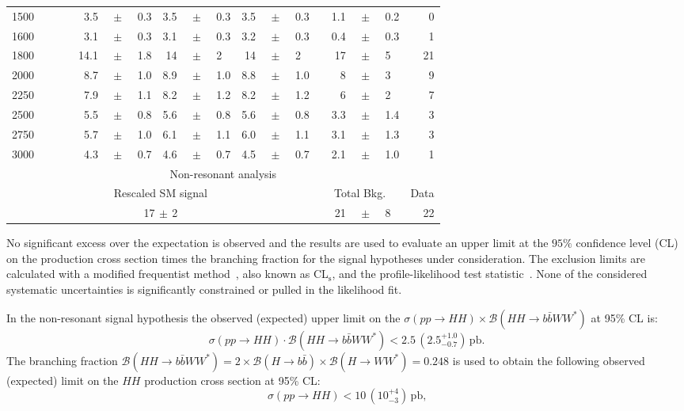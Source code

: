 \begin{table}
\begin{center}
\begin{tabular}{r|*{4}{r@{}c@{}l|}r}
1500~~~~~~& 3.5&$\,\pm\,$&0.3 & 3.5&$\,\pm\,$&0.3 & 3.5&$\,\pm\,$&0.3 & 1.1&$\,\pm\,$&0.2 & 0 \\
1600~~~~~~& 3.1&$\,\pm\,$&0.3 & 3.1&$\,\pm\,$&0.3 & 3.2&$\,\pm\,$&0.3 & ~~0.4&$\,\pm\,$&0.3 & 1 \\
1800~~~~~~& 14.1&$\,\pm\,$&1.8 & 14&$\,\pm\,$&2 & 14&$\,\pm\,$&2 & 17&$\,\pm\,$&5 & 21 \\
2000~~~~~~& 8.7&$\,\pm\,$&1.0 & 8.9&$\,\pm\,$&1.0 & 8.8&$\,\pm\,$&1.0 & 8&$\,\pm\,$&3 & 9
 \\
2250~~~~~~& 7.9&$\,\pm\,$&1.1 & 8.2&$\,\pm\,$&1.2 & 8.2&$\,\pm\,$&1.2 & 6&$\,\pm\,$&2 & 7
 \\
2500~~~~~~& 5.5&$\,\pm\,$&0.8 & 5.6&$\,\pm\,$&0.8 & 5.6&$\,\pm\,$&0.8 & 3.3&$\,\pm\,$&1.4 &
                                                                      3\\
2750~~~~~~& 5.7&$\,\pm\,$&1.0 & 6.1&$\,\pm\,$&1.1 & 6.0&$\,\pm\,$&1.1 & 3.1&$\,\pm\,$&1.3 &
                                                                      3\\
3000~~~~~~& 4.3&$\,\pm\,$&0.7 & 4.6&$\,\pm\,$&0.7 & 4.5&$\,\pm\,$&0.7 & 2.1&$\,\pm\,$&1.0 &
                                                                      1 \\
\hline
\multicolumn{14}{c}{Non-resonant analysis} \\
\hline
\multicolumn{10}{c|}{Rescaled SM signal} & \multicolumn{3}{c}{Total Bkg.} & Data \\
\hline
\multicolumn{10}{c|}{17$\,\pm\,$2} & 21&$\,\pm\,$&8 & 22\\
\end{tabular}
\end{center}
\end{table}
 
 
No significant excess over the expectation is observed and the results are used to evaluate an upper limit at the $95\%$
confidence level (CL)  on the production cross section times the
branching fraction for the signal hypotheses under consideration.
The exclusion limits are calculated with a modified frequentist
method~\cite{CLs_2002}, also known as CL$_{\mathrm{s}}$, and the
profile-likelihood test statistic~\cite{asymptotics}.  None of the considered
systematic uncertainties is significantly constrained or
pulled in the likelihood fit.
 
In the non-resonant signal hypothesis the observed (expected) upper
limit on the $\sigma(pp \to HH) \times {\mathcal{B}}( HH \to b\bar{b}WW^{\ast})$ at 95\%
CL is:
\[
\sigma(pp \to HH) \cdot {\mathcal{B}}(HH \to b\bar{b}WW^{\ast}) < 2.5 \, \left
 (2.5^{+1.0}_{-0.7} \right )  \,
{\mathrm{pb}}.
\]
The branching fraction ${\mathcal{B}}(HH \to b\bar{b}WW^{\ast}) = 2\times
{\mathcal{B}}(H \to b\bar{b}) \times {\mathcal{B}}(H \to WW^{\ast}) = 0.248$ is used to
obtain the following observed (expected) limit on the $HH$ production cross section at 95\% CL:
\[
\sigma(pp \to HH) < 10 \, \left (10^{+4}_{-3} \right) \,  {\text{pb,}}
\]
 
